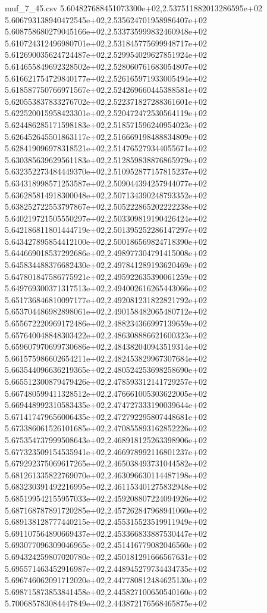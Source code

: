 \begin{filecontents*}{muf_7_45.csv}
5.604827688451073300e+02,2.537511882013286595e+02
5.606793138940472545e+02,2.535624701958986407e+02
5.608758680279045166e+02,2.533735999832460948e+02
5.610724312496980701e+02,2.531845775699948717e+02
5.612690035624724487e+02,2.529954029627851924e+02
5.614655849692328502e+02,2.528060761683054807e+02
5.616621754729840177e+02,2.526165971933005494e+02
5.618587750766971567e+02,2.524269660445388581e+02
5.620553837833276702e+02,2.522371827288361601e+02
5.622520015958423301e+02,2.520472472530564119e+02
5.624486285171598183e+02,2.518571596240954023e+02
5.626452645501863117e+02,2.516669198488834809e+02
5.628419096978318521e+02,2.514765279344055671e+02
5.630385639629561183e+02,2.512859838876865979e+02
5.632352273484449370e+02,2.510952877157815237e+02
5.634318998571253587e+02,2.509044394257944077e+02
5.636285814918300048e+02,2.507134390248793352e+02
5.638252722553797867e+02,2.505222865202222238e+02
5.640219721505550297e+02,2.503309819190426424e+02
5.642186811801444719e+02,2.501395252286147297e+02
5.643427895854412100e+02,2.500186569824718390e+02
5.644669018537292686e+02,2.498977304791415008e+02
5.645834488376682430e+02,2.497841289193620469e+02
5.647801847586775921e+02,2.495922635390061259e+02
5.649769300371317513e+02,2.494002616265443066e+02
5.651736846810097177e+02,2.492081231822821792e+02
5.653704486982898061e+02,2.490158482065480712e+02
5.655672220969172486e+02,2.488234366997139659e+02
5.657640048848303422e+02,2.486308886621600323e+02
5.659607970699730686e+02,2.484382040943519314e+02
5.661575986602654211e+02,2.482453829967307684e+02
5.663544096636219365e+02,2.480524253698258690e+02
5.665512300879479426e+02,2.478593312141729257e+02
5.667480599411328512e+02,2.476661005303622005e+02
5.669448992310583435e+02,2.474727333190039644e+02
5.671417479656006435e+02,2.472792295807448681e+02
5.673386061526101685e+02,2.470855893162852226e+02
5.675354737999508643e+02,2.468918125263398906e+02
5.677323509154535941e+02,2.466978992116801237e+02
5.679292375069617265e+02,2.465038493731044582e+02
5.681261335822769070e+02,2.463096630114487198e+02
5.683230391492216995e+02,2.461153401275832948e+02
5.685199542155957033e+02,2.459208807224094926e+02
5.687168787891720285e+02,2.457262847968941060e+02
5.689138128777440215e+02,2.455315523519911949e+02
5.691107564890669437e+02,2.453366833887530447e+02
5.693077096309046965e+02,2.451416779082046560e+02
5.694324259807020780e+02,2.450181291666567631e+02
5.695571463452916987e+02,2.448945279734434735e+02
5.696746062091712020e+02,2.447780812484625130e+02
5.698715873853841458e+02,2.445827100650540160e+02
5.700685783084447849e+02,2.443872176568465875e+02

\end{filecontents*}
